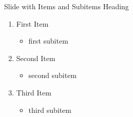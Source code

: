 \documentclass[newPxFont]{beamer}
\begin{document}
\begin{frame}[c]{Slide with Items and Subitems}
	Heading	
	\begin{enumerate}   
		\item{First Item}  
		\begin{itemize}
			\item{first subitem}
		\end{itemize}
		\item{Second Item}
		\begin{itemize}
			\item{second subitem}
		\end{itemize}
		\item{Third Item}
		\begin{itemize}
			\item{third subitem}
		\end{itemize}
	\end{enumerate}	
\end{frame}

%
%
\end{document}
